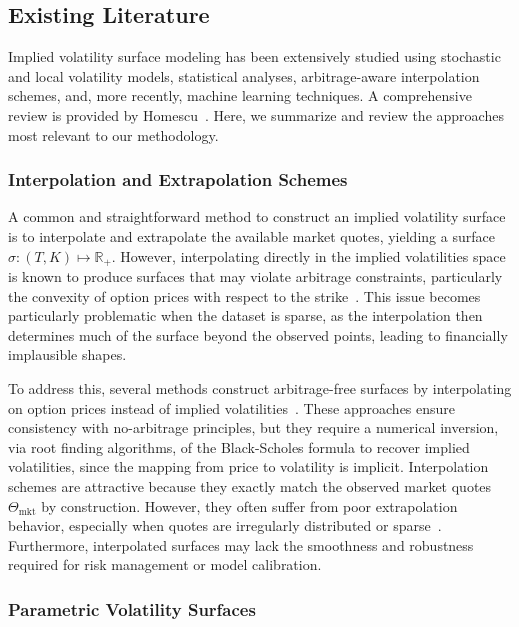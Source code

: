 \subsection{Existing Literature}

Implied volatility surface modeling has been extensively studied using stochastic and local volatility models, statistical analyses, arbitrage-aware interpolation schemes, and, more recently, machine learning techniques.
A comprehensive review is provided by Homescu~\cite{homescu2011implied}.
Here, we summarize and review the approaches most relevant to our methodology.

\subsubsection{Interpolation and Extrapolation Schemes}

A common and straightforward method to construct an implied volatility surface is to interpolate and extrapolate the available market quotes, yielding a surface $\hat\sigma: (T,K) \mapsto \mathbb{R}_+$.
However, interpolating directly in the implied volatilities space is known to produce surfaces that may violate arbitrage constraints, particularly the convexity of option prices with respect to the strike~\cite{andreasen2011volatility}.
This issue becomes particularly problematic when the dataset is sparse, as the interpolation then determines much of the surface beyond the observed points, leading to financially implausible shapes.

To address this, several methods construct arbitrage-free surfaces by interpolating on option prices instead of implied volatilities~\cite{lefloch2021arbitrage, corbetta2019robust}.
These approaches ensure consistency with no-arbitrage principles, but they require a numerical inversion, via root finding algorithms, of the Black-Scholes formula to recover implied volatilities, since the mapping from price to volatility is implicit.
Interpolation schemes are attractive because they exactly match the observed market quotes $\Theta_{\text{mkt}}$ by construction.
However, they often suffer from poor extrapolation behavior, especially when quotes are irregularly distributed or sparse~\cite{guo2016generalized}.
Furthermore, interpolated surfaces may lack the smoothness and robustness required for risk management or model calibration.

\subsubsection{Parametric Volatility Surfaces}

